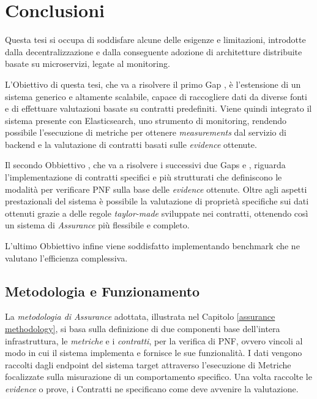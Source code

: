 \chapter{Conclusioni}\label{conclusione}


Questa tesi si occupa di soddisfare alcune delle esigenze e limitazioni, introdotte dalla decentralizzazione e dalla conseguente adozione di architetture distribuite basate su microservizi, legate al monitoring.

L'Obiettivo  di questa tesi, che va a risolvere il primo Gap , è l'estensione di un sistema generico e altamente scalabile, capace di raccogliere dati da diverse fonti e di effettuare valutazioni basate su contratti predefiniti.
Viene quindi integrato il sistema presente con Elasticsearch, uno strumento di monitoring, rendendo possibile l'esecuzione di metriche per ottenere \textit{measurements} dal servizio di backend e la valutazione di contratti basati sulle \textit{evidence} ottenute.

Il secondo Obbiettivo , che va a risolvere i successivi due Gaps  e , riguarda l'implementazione di contratti specifici e più strutturati che definiscono le modalità per verificare \gls{PNF} sulla base delle \textit{evidence} ottenute.
Oltre agli aspetti prestazionali del sistema è possibile la valutazione di proprietà specifiche sui dati ottenuti grazie a delle regole \textit{taylor-made} sviluppate nei contratti, ottenendo così un sistema di \textit{Assurance} più flessibile e completo.

L'ultimo Obbiettivo  infine viene soddisfatto implementando benchmark che ne valutano l'efficienza complessiva.

\section{Metodologia e Funzionamento}
La \emph{metodologia di Assurance} adottata, illustrata nel Capitolo \ref{assurance methodology}, si basa sulla definizione di due componenti base dell'intera infrastruttura, le \emph{metriche} e i \emph{contratti}, per la verifica di \gls{PNF}, ovvero vincoli al modo in cui il sistema implementa e fornisce le sue funzionalità.
I dati vengono raccolti dagli endpoint del sistema target attraverso l'esecuzione di Metriche focalizzate sulla misurazione di un comportamento specifico. 
Una volta raccolte le \textit{evidence} o prove, i Contratti ne specificano come deve avvenire la valutazione.

